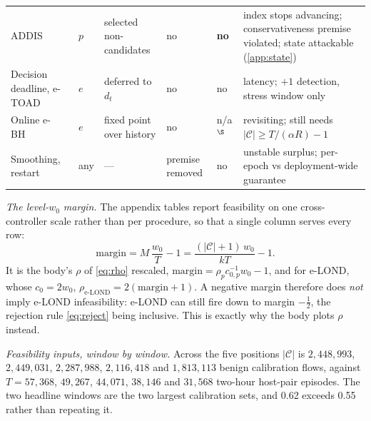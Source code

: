 \documentclass[conference]{IEEEtran}
\newcommand{\Cal}{\mathcal{C}}
\newcommand{\nCal}{\lvert\Cal\rvert}
\newcommand{\ceil}{M}
\begin{document}
\begin{table}[t]
\begin{tabular}{@{}l l p{2.3cm} l l p{4.7cm}@{}}
ADDIS~\cite{tian2019addis} & $p$ & selected non-candidates & no & \textbf{no} & index stops advancing; conservativeness premise violated; state attackable (\cref{app:state}) \\
Decision deadline, e-TOAD~\cite{fisher2022deadlines,xu2026eclosure} & $e$ & deferred to $d_t$ & no & no & latency; $+1$ detection, stress window only \\
Online e-BH~\cite{xu2024elond,fischer2025onlineebh} & $e$ & fixed point over history & no & n/a$^{\S}$ & revisiting; still needs $\nCal\ge T/(\alpha R)-1$ \\
Smoothing, restart & any & --- & premise removed & no & unstable surplus; per-epoch vs deployment-wide guarantee \\
\bottomrule
\end{tabular}
\end{table}

\emph{The level-$w_0$ margin.} The appendix tables report feasibility on one cross-controller scale
rather than per procedure, so that a single column serves every row:
\begin{equation}\label{eq:margin}
\text{margin}=\ceil\,\frac{w_0}{T}-1=\frac{(\nCal+1)\,w_0}{kT}-1 .
\end{equation}
It is the body's $\rho$ of \eqref{eq:rho} rescaled, $\text{margin}=\rho_p c_{0,p}^{-1}w_0-1$, and for
e-LOND, whose $c_0=2w_0$, $\rho_{\text{e-LOND}}=2(\text{margin}+1)$. A negative margin therefore does
\emph{not} imply e-LOND infeasibility: e-LOND can still fire down to margin $-\tfrac12$, the rejection
rule \eqref{eq:reject} being inclusive. This is exactly why the body plots $\rho$ instead.

\emph{Feasibility inputs, window by window.} Across the five positions $\nCal$ is
$2{,}448{,}993$, $2{,}449{,}031$, $2{,}287{,}988$, $2{,}116{,}418$ and $1{,}813{,}113$ benign
calibration flows, against $T=57{,}368$, $49{,}267$, $44{,}071$, $38{,}146$ and $31{,}568$ two-hour
host-pair episodes. The two headline windows are the two largest calibration sets, and 0.62 exceeds
0.55 rather than repeating it.
\end{document}
